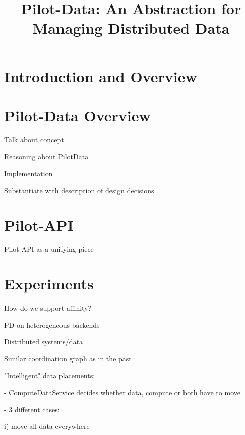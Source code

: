 \documentclass[conference]{IEEEtran}
\begin{document}

\title{Pilot-Data: An Abstraction for Managing Distributed Data}

\author{}

\date{}
\maketitle

\begin{abstract} 

 
\end{abstract}

\section{Introduction and Overview} 

\section{Pilot-Data Overview}

Talk about concept

Reasoning about PilotData

Implementation

Substantiate with description of design decisions

\section{Pilot-API}
Pilot-API as a unifying piece


\section{Experiments}

How do we support affinity?

PD on heterogeneous backends

Distributed systems/data

Similar coordination graph as in the past

"Intelligent" data placements:

- ComputeDataService decides whether data, compute or both have to move

- 3 different cases:

i) move all data everywhere
\end{document}
